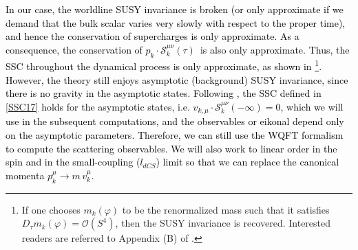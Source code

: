 \textcolor{black}{In our case, the worldline SUSY invariance is broken (or only approximate if we demand that the bulk scalar varies very slowly with respect to the proper time), and hence the conservation of supercharges is only approximate. As a consequence, the conservation of $p_k\cdot \mathcal{S}_k^{\mu\nu}(\tau)\,$ is also only approximate. Thus, the SSC throughout the dynamical process is only approximate, as shown in \cite{Loutrel:2018ydv}\footnote{If one chooses $m_k(\varphi)$ to be the renormalized mass such that it satisfies $D_{\tau} m_{k}(\varphi)=\mathcal{O}(S^4)$, then the SUSY invariance is recovered. Interested readers are referred to Appendix (B) of \cite{Loutrel:2018ydv}.}. However, the theory still enjoys asymptotic (background) SUSY invariance, since there is no gravity in the asymptotic states. Following \cite{Loutrel:2018ydv}, the SSC defined in \eqref{SSC17} holds for the asymptotic states, i.e. $v_{k,\mu} \cdot \mathcal{S}_k^{\mu\nu}(-\infty)=0$, which we will use in the subsequent computations, and the observables or eikonal depend only on the asymptotic parameters. Therefore, we can still use the WQFT formalism to compute the scattering observables. We will also work to linear order in the spin and in the small-coupling ($l_{dCS}$) limit so that we can replace the canonical momenta $p_k^\mu\to m\,v_k^\mu$. 
}
\par
